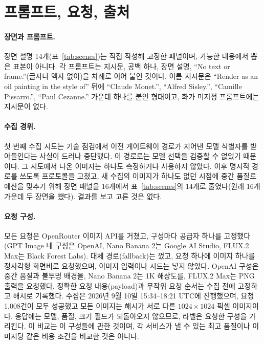 \section{프롬프트, 요청, 출처}\label{app:provenance}

\paragraph{장면과 프롬프트.}
장면 설명 14개(표~\ref{tab:scenes})는 직접 작성해 고정한 패널이며, 가능한 내용에서 뽑은 표본이
아니다. 각 프롬프트는 지시문, 공백 하나, 장면 설명, ``No text or frame.''(글자나 액자 없이)을 차례로
이어 붙인 것이다. 이름 지시문은 ``Render as an oil painting in the style of'' 뒤에 ``Claude Monet.'',
``Alfred Sisley.'', ``Camille Pissarro.'', ``Paul Cezanne.'' 가운데 하나를 붙인 형태이고, 화가 미지정
프롬프트에는 지시문이 없다.



\paragraph{수집 경위.} 첫 번째 수집 시도는 기술 점검에서 이전 게이트웨이 경로가 지어낸 모델 식별자를
받아들인다는 사실이 드러나 중단했다. 이 경로로는 모델 선택을 검증할 수 없었기 때문이다. 그 시도에서
나온 이미지는 하나도 측정하거나 사용하지 않았다. 이후 명시적 경로를 쓰도록 프로토콜을 고쳤고, 새 수집의
이미지가 하나도 없던 시점에 중간 품질로 예산을 맞추기 위해 장면 패널을 16개에서 표~\ref{tab:scenes}의
14개로 줄였다(원래 16개 가운데 두 장면을 뺐다). 결과를 보고 고른 것은 없다.

\paragraph{요청 구성.}
모든 요청은 OpenRouter 이미지 API를 거쳤고, 구성마다 공급자 하나를 고정했다(GPT Image 네 구성은
OpenAI, Nano Banana 2는 Google AI Studio, FLUX.2 Max는 Black Forest Labs). 대체 경로(fallback)는 껐고,
요청 하나에 이미지 하나를 정사각형 화면비로 요청했으며, 이미지 입력이나 시드는 넣지 않았다. OpenAI
구성은 중간 품질과 불투명 배경을, Nano Banana 2는 1K 해상도를, FLUX.2 Max는 PNG 출력을 요청했다.
정확한 요청 내용(payload)과 무작위 요청 순서는 수집 전에 고정하고 해시로 기록했다. 수집은 2026년 9월
10일 15:34--18:21 UTC에 진행했으며, 요청 1,008건이 모두 성공했고 모든 이미지는 해시가 서로 다른
$1024\times1024$ 픽셀 이미지이다. 응답에는 모델, 품질, 크기 필드가 되돌아오지 않으므로, 라벨은 요청한
구성을 가리킨다. 이 비교는 이 구성들에 관한 것이며, 각 서비스가 낼 수 있는 최고 품질이나 이미지당 같은
비용 조건을 비교한 것은 아니다.

